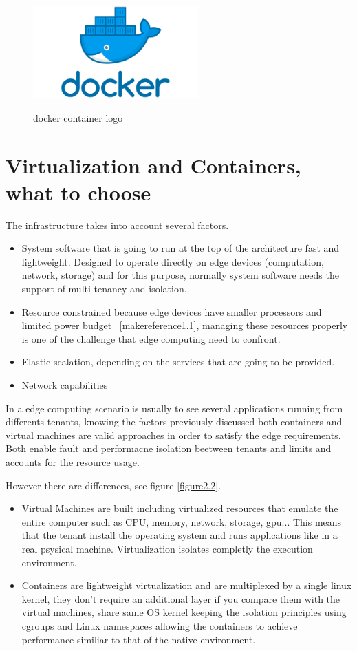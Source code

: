 \begin{figure}[h!]%
    \centering
    \includegraphics[width=2.5in]{figures/docker.png}
~\caption{docker container logo}
\label{figure2.1}
\end{figure}

\section{Virtualization and Containers, what to choose}
\label{makereference2.2}

The infrastructure takes into account several factors.

\begin{itemize}
    \item System software that is going to run at the top of the architecture fast and lightweight. Designed to operate directly on edge devices (computation, network, storage) and for this purpose, normally system software needs the support of multi-tenancy and isolation.
    \item Resource constrained because edge devices have smaller processors and limited power budget ~\ref{makereference1.1}, managing these resources properly is one of the challenge that edge computing need to confront.
    \item Elastic scalation, depending on the services that are going to be provided.
    \item Network capabilities
\end{itemize}
In a edge computing scenario is usually to see several applications running from differents tenants, knowing the factors previously discussed both containers and virtual machines are valid approaches in order to satisfy the edge requirements.~\cite{CORR:chong:2018} Both enable fault and performacne isolation beetween tenants and limits and accounts for the resource usage.
\newpage

However there are differences, see figure \ref{figure2.2}.

\begin{itemize}
  \item Virtual Machines are built including virtualized resources that emulate the entire computer such as  CPU, memory, network, storage, gpu... This means that the tenant install the operating system and runs applications like in a real psysical machine. Virtualization isolates completly the execution environment.
  \item Containers are lightweight virtualization and are multiplexed by a single linux kernel, they don't require an additional layer if you compare them with the virtual machines, share same OS kernel keeping the isolation principles using cgroups and Linux namespaces allowing the containers to achieve performance similiar to that of the native environment.
\end{itemize}

